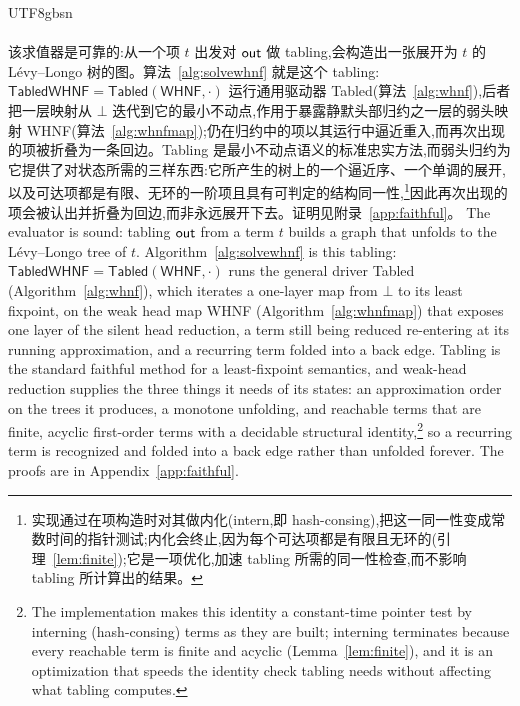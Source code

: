 \begin{CJK*}{UTF8}{gbsn}
  \paragraph{}
  \ifTablambdaChinese
  该求值器是可靠的:从一个项 $t$ 出发对 $\mathsf{out}$ 做 tabling,会构造出一张展开为 $t$ 的 Lévy--Longo 树的图。算法~\ref{alg:solvewhnf} 就是这个 tabling:$\textsf{TabledWHNF} = \textsf{Tabled}(\textsf{WHNF}, \cdot)$ 运行通用驱动器 \textsf{Tabled}(算法~\ref{alg:whnf}),后者把一层映射从 $\bot$ 迭代到它的最小不动点,作用于暴露静默头部归约之一层的弱头映射 \textsf{WHNF}(算法~\ref{alg:whnfmap});仍在归约中的项以其运行中逼近重入,而再次出现的项被折叠为一条回边。Tabling 是最小不动点语义的标准忠实方法,而弱头归约为它提供了对状态所需的三样东西:它所产生的树上的一个逼近序、一个单调的展开,以及可达项都是有限、无环的一阶项且具有可判定的结构同一性,\footnote{实现通过在项构造时对其做内化(intern,即 hash-consing),把这一同一性变成常数时间的指针测试;内化会终止,因为每个可达项都是有限且无环的(引理~\ref{lem:finite});它是一项优化,加速 tabling 所需的同一性检查,而不影响 tabling 所计算出的结果。}因此再次出现的项会被认出并折叠为回边,而非永远展开下去。证明见附录~\ref{app:faithful}。
  \else
  The evaluator is sound: tabling $\mathsf{out}$ from a term $t$ builds a graph that unfolds to the L\'evy--Longo tree of $t$. Algorithm~\ref{alg:solvewhnf} is this tabling: $\textsf{TabledWHNF} = \textsf{Tabled}(\textsf{WHNF}, \cdot)$ runs the general driver \textsf{Tabled} (Algorithm~\ref{alg:whnf}), which iterates a one-layer map from $\bot$ to its least fixpoint, on the weak head map \textsf{WHNF} (Algorithm~\ref{alg:whnfmap}) that exposes one layer of the silent head reduction, a term still being reduced re-entering at its running approximation, and a recurring term folded into a back edge. Tabling is the standard faithful method for a least-fixpoint semantics, and weak-head reduction supplies the three things it needs of its states: an approximation order on the trees it produces, a monotone unfolding, and reachable terms that are finite, acyclic first-order terms with a decidable structural identity,\footnote{The implementation makes this identity a constant-time pointer test by interning (hash-consing) terms as they are built; interning terminates because every reachable term is finite and acyclic (Lemma~\ref{lem:finite}), and it is an optimization that speeds the identity check tabling needs without affecting what tabling computes.} so a recurring term is recognized and folded into a back edge rather than unfolded forever. The proofs are in Appendix~\ref{app:faithful}.
  \fi


\end{CJK*}
